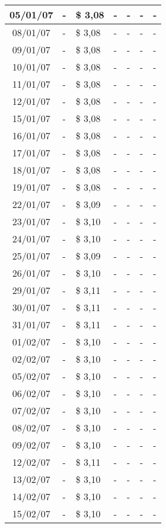 \begin{center}
\begin{longtable}{|c|p{1.5cm}|p{1.5cm}|p{1.5cm}|p{1.5cm}|p{1.5cm}|p{1.5cm}|}
05/01/07 & - & \$ 3,08 & - & - & - & - \\ \hline
08/01/07 & - & \$ 3,08 & - & - & - & - \\ \hline
09/01/07 & - & \$ 3,08 & - & - & - & - \\ \hline
10/01/07 & - & \$ 3,08 & - & - & - & - \\ \hline
11/01/07 & - & \$ 3,08 & - & - & - & - \\ \hline
12/01/07 & - & \$ 3,08 & - & - & - & - \\ \hline
15/01/07 & - & \$ 3,08 & - & - & - & - \\ \hline
16/01/07 & - & \$ 3,08 & - & - & - & - \\ \hline
17/01/07 & - & \$ 3,08 & - & - & - & - \\ \hline
18/01/07 & - & \$ 3,08 & - & - & - & - \\ \hline
19/01/07 & - & \$ 3,08 & - & - & - & - \\ \hline
22/01/07 & - & \$ 3,09 & - & - & - & - \\ \hline
23/01/07 & - & \$ 3,10 & - & - & - & - \\ \hline
24/01/07 & - & \$ 3,10 & - & - & - & - \\ \hline
25/01/07 & - & \$ 3,09 & - & - & - & - \\ \hline
26/01/07 & - & \$ 3,10 & - & - & - & - \\ \hline
29/01/07 & - & \$ 3,11 & - & - & - & - \\ \hline
30/01/07 & - & \$ 3,11 & - & - & - & - \\ \hline
31/01/07 & - & \$ 3,11 & - & - & - & - \\ \hline
01/02/07 & - & \$ 3,10 & - & - & - & - \\ \hline
02/02/07 & - & \$ 3,10 & - & - & - & - \\ \hline
05/02/07 & - & \$ 3,10 & - & - & - & - \\ \hline
06/02/07 & - & \$ 3,10 & - & - & - & - \\ \hline
07/02/07 & - & \$ 3,10 & - & - & - & - \\ \hline
08/02/07 & - & \$ 3,10 & - & - & - & - \\ \hline
09/02/07 & - & \$ 3,10 & - & - & - & - \\ \hline
12/02/07 & - & \$ 3,11 & - & - & - & - \\ \hline
13/02/07 & - & \$ 3,10 & - & - & - & - \\ \hline
14/02/07 & - & \$ 3,10 & - & - & - & - \\ \hline
15/02/07 & - & \$ 3,10 & - & - & - & - \\ \hline

\end{longtable}
\end{center}
